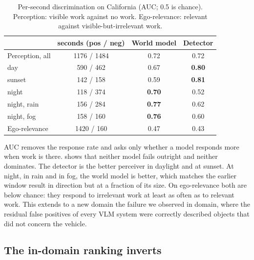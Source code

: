 \documentclass[conference]{IEEEtran}
\begin{document}
\begin{table}[t]
\centering
\caption{Per-second discrimination on California (AUC; 0.5 is chance). Perception: visible work against no work. Ego-relevance: relevant against visible-but-irrelevant work.}
\label{tab:auc}
\footnotesize
\setlength{\tabcolsep}{4pt}
\begin{tabular}{@{}lccc@{}}
\toprule
 & seconds (pos / neg) & World model & Detector \\
\midrule
Perception, all & 1176 / 1484 & 0.72 & 0.72 \\
\quad day & 590 / 462 & 0.67 & \textbf{0.80} \\
\quad sunset & 142 / 158 & 0.59 & \textbf{0.81} \\
\quad night & 118 / 374 & \textbf{0.70} & 0.52 \\
\quad night, rain & 156 / 284 & \textbf{0.77} & 0.62 \\
\quad night, fog & 158 / 160 & \textbf{0.76} & 0.60 \\
Ego-relevance & 1420 / 160 & 0.47 & 0.43 \\
\bottomrule
\end{tabular}
\end{table}

AUC removes the response rate and asks only whether a model responds more when work is there.  shows that neither model fails outright and neither dominates. The detector is the better perceiver in daylight and at sunset. At night, in rain and in fog, the world model is better, which matches the earlier window result in direction but at a fraction of its size. On ego-relevance both are below chance: they respond to irrelevant work at least as often as to relevant work. This extends to a new domain the failure we observed in domain, where the residual false positives of every VLM system were correctly described objects that did not concern the vehicle.

\subsection{The in-domain ranking inverts}
\end{document}
